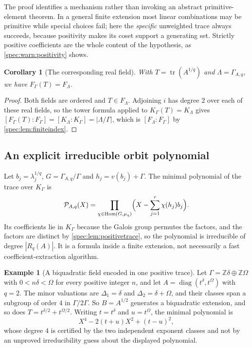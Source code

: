 \documentclass[11pt,a4paper]{article}
\numberwithin{equation}{section}
\newtheorem{corollary}[corollary]{Corollary}
\theoremstyle{definition}
\newtheorem{example}[example]{Example}
\theoremstyle{remark}
\newcommand{\Z}{\mathbb Z}
\newcommand{\tr}{\operatorname{tr}}
\newcommand{\diag}{\operatorname{diag}}
\newcommand{\Hom}{\operatorname{Hom}}
\begin{document}
The proof identifies a mechanism rather than invoking an abstract
primitive-element theorem. In a general finite extension most linear
combinations may be primitive while special choices fail; here the
\emph{specific} unweighted trace always succeeds, because positivity makes
its coset support a generating set. Strictly positive coefficients are the
whole content of the hypothesis, as \cref{spec:warn:positivity} shows.

\begin{corollary}[The corresponding real field]\label{spec:cor:realtrace}
With $T=\tr(A^{1/q})$ and $\Lambda=\Gamma_{A,q}$, we have
$F_\Gamma(T)=F_\Lambda$.
\end{corollary}
\begin{proof}
Both fields are ordered and $T\in F_\Lambda$. Adjoining $i$ has degree $2$
over each of these real fields, so the tower formula applied to
$K_\Gamma(T)=K_\Lambda$ gives
$[F_\Gamma(T):F_\Gamma]=[K_\Lambda:K_\Gamma]=|\Lambda/\Gamma|$, which is
$[F_\Lambda:F_\Gamma]$ by \cref{spec:lem:finiteindex}.
\end{proof}

\subsection{An explicit irreducible orbit polynomial}

Let $b_j=\lambda_j^{1/q}$, $G=\Gamma_{A,q}/\Gamma$ and $h_j=v(b_j)+\Gamma$.
The minimal polynomial of the trace over $K_\Gamma$ is
\begin{equation}\label{spec:eq:orbitpoly}
 \mathcal P_{A,q}(X)=\prod_{\chi\in\Hom(G,\mu_q)}
   \Bigl(X-\sum_{j=1}^r\chi(h_j)b_j\Bigr).
\end{equation}
Its coefficients lie in $K_\Gamma$ because the Galois group permutes the
factors, and the factors are distinct by \cref{spec:lem:positivetrace}, so
the polynomial is irreducible of degree $|R_q(A)|$. It is a formula inside a
finite extension, not necessarily a fast coefficient-extraction algorithm.

\begin{example}[A biquadratic field encoded in one positive trace]\label{spec:ex:biquadratic}
Let $\Gamma=\Z\delta\oplus\Z\Omega$ with $0<n\delta<\Omega$ for every
positive integer $n$, and let $A=\diag(t^\delta,t^\Omega)$ with $q=2$. The
minor valuations are $\Delta_1=\delta$ and $\Delta_2=\delta+\Omega$, and
their classes span a subgroup of order $4$ in $\Gamma/2\Gamma$. So
$B=A^{1/2}$ generates a biquadratic extension, and so does
$T=t^{\delta/2}+t^{\Omega/2}$. Writing $t=t^\delta$ and $u=t^\Omega$, the
minimal polynomial is
\begin{equation}\label{spec:eq:biquadratic}
 X^4-2(t+u)X^2+(t-u)^2,
\end{equation}
whose degree $4$ is certified by the two independent exponent classes and
not by an unproved irreducibility guess about the displayed polynomial.
\end{example}
\end{document}
